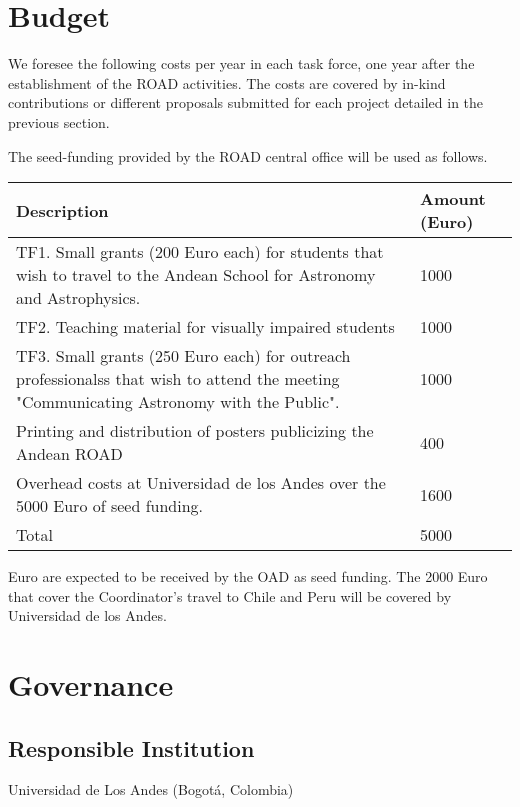 \documentclass[12pt]{article}
\begin{document}
\section{Budget}

We foresee the following costs per year in each task force, one year
after the establishment of the ROAD activities. The costs are covered
by in-kind contributions or different proposals submitted for each
project detailed in the previous section. 

The seed-funding provided by the ROAD central office will be used as follows.


\begin{center}
\begin{tabular}{|p{11cm} |p{1.5cm}|}\hline\hline
Description &Amount (Euro) \\\hline
TF1. Small grants (200 Euro each) for students that wish to travel to
the Andean School for Astronomy and Astrophysics. & 1000\\\hline
TF2.  Teaching material for visually impaired students & 1000\\\hline
TF3. Small grants (250 Euro each) for outreach professionalss that
wish to attend the meeting "Communicating Astronomy with the Public".&
1000\\\hline  
Printing and distribution of posters publicizing the Andean ROAD
&400 \\\hline 
Overhead costs at Universidad de los Andes over the 5000 Euro of seed
funding. & 1600\\\hline 
Total &5000\\\hline\hline
\end{tabular}
\end{center}

 Euro are expected to be received by the OAD as seed funding. The
2000 Euro that cover the Coordinator’s travel to Chile and Peru will
be covered by Universidad de los Andes. 

\section{Governance}

\subsection*{Responsible Institution}
\noindent
Universidad de Los Andes (Bogotá, Colombia)
\end{document}
